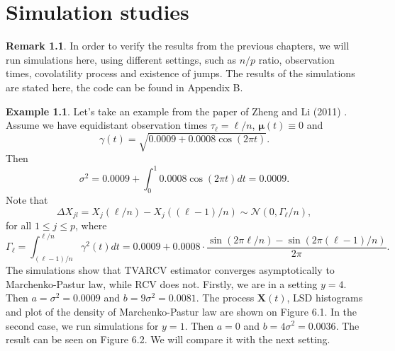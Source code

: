 \documentclass[a4paper,11pt]{book}
\theoremstyle{plain}
\theoremstyle{definition}
\newtheorem{exmp}[thm]{Example}
\newtheorem{rmrk}[thm]{Remark}
\begin{document}
    
    \chapter{Simulation studies}
    
    \begin{rmrk}
    	In order to verify the results from the previous chapters, we will run simulations here, using different settings, such as $n/p$ ratio, observation times, covolatility process and existence of jumps. The results of the simulations are stated here, the code can be found in Appendix B.
    \end{rmrk}
    
    \begin{exmp} \label{SimCos}
    	Let's take an example from the paper of Zheng and Li (2011) \cite{Main}. Assume we have equidistant observation times $\tau_{\ell} = \ell / n$, $\boldsymbol{\mu}(t) \equiv 0$ and
    	\[
    	\gamma(t) = \sqrt{0.0009 + 0.0008 \cos(2 \pi t)}.
    	\]
    	Then
    	\[ \sigma^2 = 0.0009 + \int_{0}^{1}0.0008 \cos(2 \pi t) dt = 0.0009. \]
    	Note that
    	\[ \Delta X_{jl} = X_j(\ell/n) - X_j((\ell-1)/n) \sim \mathcal{N}(0, \Gamma_\ell / n ), \]
    	for all $1 \leq j \leq p$, where
    	\[ \Gamma_\ell = \int_{(\ell-1)/n}^{\ell / n} \gamma^2(t)dt = 0.0009 + 0.0008 \cdot \frac{ \sin(2\pi \ell / n )-\sin(2\pi (\ell-1) / n ) }{2\pi}. \]
    	The simulations show that TVARCV estimator converges asymptotically to Marchenko-Pastur law, while RCV does not.
    	Firstly, we are in a setting $y = 4$. Then $a = \sigma^2 = 0.0009$ and $b = 9\sigma^2 = 0.0081$. The process $\mathbf{X}(t)$, LSD histograms and plot of the density of Marchenko-Pastur law are shown on Figure 6.1.
    	In the second case, we run simulations for $y = 1$. Then $a = 0$ and $b = 4\sigma^2 = 0.0036$. The result can be seen on Figure 6.2. We will compare it with the next setting.
    \end{exmp}
    
\end{document}
